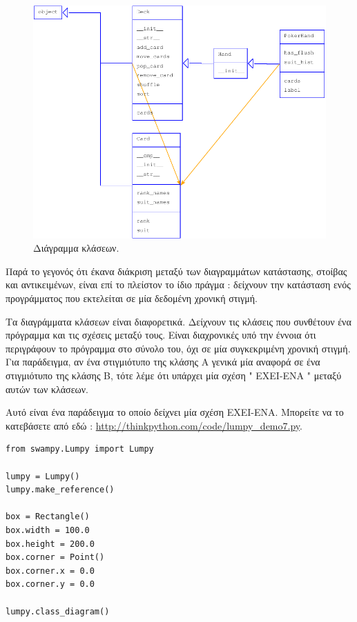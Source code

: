 \documentclass[10pt]{book}
\begin{document}
\begin{figure}
\centerline
{\includegraphics[scale=0.7]{figs/lumpydemo8.pdf}}
\caption{Διάγραμμα κλάσεων.}
\label{fig.lumpy8}
\end{figure}

Παρά το γεγονός ότι έκανα διάκριση μεταξύ των διαγραμμάτων κατάστασης, στοίβας και αντικειμένων, είναι επί το πλείστον το ίδιο πράγμα :  δείχνουν την κατάσταση ενός προγράμματος που εκτελείται σε μία δεδομένη χρονική στιγμή.

Τα διαγράμματα κλάσεων είναι διαφορετικά.  Δείχνουν τις κλάσεις που συνθέτουν ένα πρόγραμμα και τις σχέσεις μεταξύ τους.  Είναι διαχρονικές υπό την έννοια ότι περιγράφουν το πρόγραμμα στο σύνολο του, όχι σε μία συγκεκριμένη χρονική στιγμή.  
Για παράδειγμα, αν ένα στιγμιότυπο της κλάσης Α γενικά μία αναφορά σε ένα στιγμιότυπο της κλάσης Β, τότε λέμε ότι υπάρχει μία σχέση  " ΕΧΕΙ-ΕΝΑ "  μεταξύ αυτών των κλάσεων.

Αυτό είναι ένα παράδειγμα το οποίο δείχνει μία σχέση ΕΧΕΙ-ΕΝΑ.  Μπορείτε να το κατεβάσετε από εδώ : \url{http://thinkpython.com/code/lumpy_demo7.py}.

\begin{verbatim}
from swampy.Lumpy import Lumpy

lumpy = Lumpy()
lumpy.make_reference()

box = Rectangle()
box.width = 100.0
box.height = 200.0
box.corner = Point()
box.corner.x = 0.0
box.corner.y = 0.0

lumpy.class_diagram()
\end{verbatim}
\end{document}
